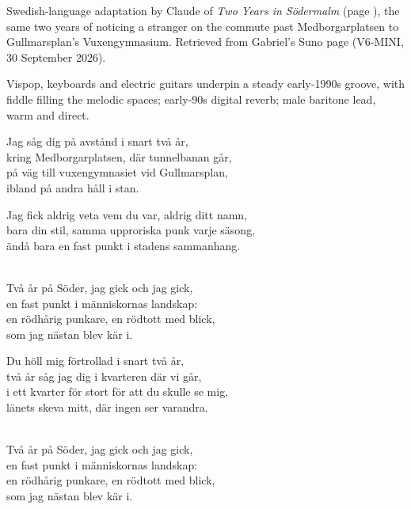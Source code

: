 
\begin{notes}
Swedish-language adaptation by Claude of \emph{Two Years in Södermalm} (page \pageref{sec:two-years-in-sodermalm}), the same two years of noticing a stranger on the commute past Medborgarplatsen to Gullmarsplan's Vuxengymnasium. Retrieved from Gabriel's Suno page (V6-MINI, 30 September 2026).
\end{notes}
\begin{style}
Vispop, keyboards and electric guitars underpin a steady early-1990s groove, with fiddle filling the melodic spaces; early-90s digital reverb; male baritone lead, warm and direct.
\end{style}
\begin{lyrics}
Jag såg dig på avstånd i snart två år,\\
kring Medborgarplatsen, där tunnelbanan går,\\
på väg till vuxengymnasiet vid Gullmarsplan,\\
ibland på andra håll i stan.

Jag fick aldrig veta vem du var, aldrig ditt namn,\\
bara din stil, samma upproriska punk varje säsong,\\
ändå bara en fast punkt i stadens sammanhang.

\\
Två år på Söder, jag gick och jag gick,\\
en fast punkt i människornas landskap:\\
en rödhårig punkare, en rödtott med blick,\\
som jag nästan blev kär i.

Du höll mig förtrollad i snart två år,\\
två år såg jag dig i kvarteren där vi går,\\
i ett kvarter för stort för att du skulle se mig,\\
länets skeva mitt, där ingen ser varandra.

\\
Två år på Söder, jag gick och jag gick,\\
en fast punkt i människornas landskap:\\
en rödhårig punkare, en rödtott med blick,\\
som jag nästan blev kär i.


\end{lyrics}
